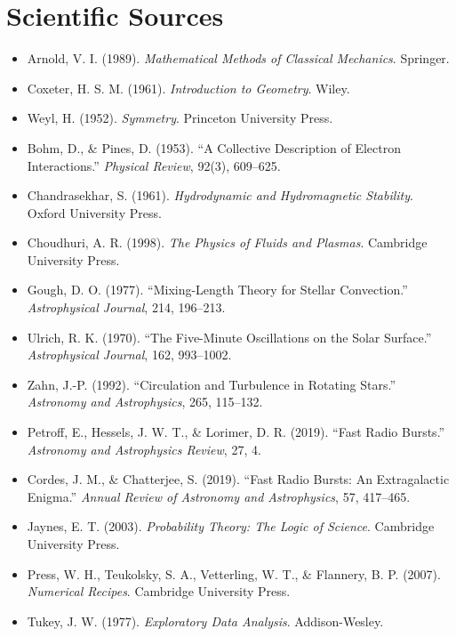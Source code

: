 \documentclass[11pt, letterpaper, openany]{book}
\begin{document}
\section*{Scientific Sources}

\begin{itemize}

\item Arnold, V. I. (1989). \textit{Mathematical Methods of Classical Mechanics}. Springer.
\item Coxeter, H. S. M. (1961). \textit{Introduction to Geometry}. Wiley.
\item Weyl, H. (1952). \textit{Symmetry}. Princeton University Press.

\item Bohm, D., \& Pines, D. (1953). “A Collective Description of Electron Interactions.” \textit{Physical Review}, 92(3), 609–625.
\item Chandrasekhar, S. (1961). \textit{Hydrodynamic and Hydromagnetic Stability}. Oxford University Press.
\item Choudhuri, A. R. (1998). \textit{The Physics of Fluids and Plasmas}. Cambridge University Press.
\item Gough, D. O. (1977). “Mixing-Length Theory for Stellar Convection.” \textit{Astrophysical Journal}, 214, 196–213.
\item Ulrich, R. K. (1970). “The Five-Minute Oscillations on the Solar Surface.” \textit{Astrophysical Journal}, 162, 993–1002.
\item Zahn, J.-P. (1992). “Circulation and Turbulence in Rotating Stars.” \textit{Astronomy and Astrophysics}, 265, 115–132.

\item Petroff, E., Hessels, J. W. T., \& Lorimer, D. R. (2019). “Fast Radio Bursts.” \textit{Astronomy and Astrophysics Review}, 27, 4.
\item Cordes, J. M., \& Chatterjee, S. (2019). “Fast Radio Bursts: An Extragalactic Enigma.” \textit{Annual Review of Astronomy and Astrophysics}, 57, 417–465.

\item Jaynes, E. T. (2003). \textit{Probability Theory: The Logic of Science}. Cambridge University Press.
\item Press, W. H., Teukolsky, S. A., Vetterling, W. T., \& Flannery, B. P. (2007). \textit{Numerical Recipes}. Cambridge University Press.
\item Tukey, J. W. (1977). \textit{Exploratory Data Analysis}. Addison-Wesley.


\end{itemize}
\end{document}
